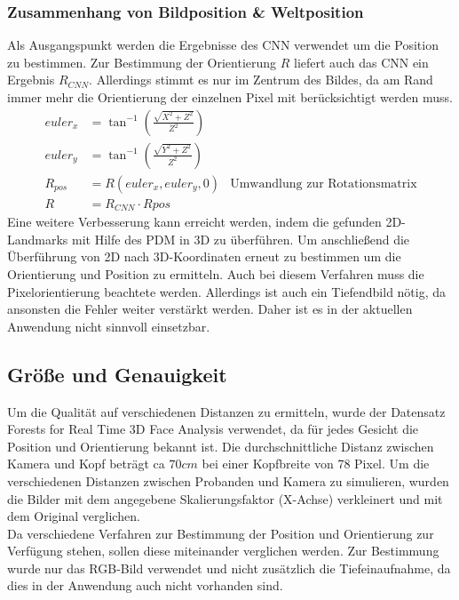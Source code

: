 \subsubsection{Zusammenhang von Bildposition \& Weltposition}
Als Ausgangspunkt werden die Ergebnisse des CNN verwendet um die Position zu bestimmen. Zur Bestimmung der Orientierung $R$ liefert auch das CNN ein Ergebnis $R_{CNN}$. Allerdings stimmt es nur im Zentrum des Bildes, da am Rand immer mehr die Orientierung der einzelnen Pixel mit berücksichtigt werden muss.\\
\begin{align*}
euler_x &= \tan^{-1}(\frac{\sqrt{X^2+Z^2}}{Z^2})\\
euler_y &= \tan^{-1}(\frac{\sqrt{Y^2+Z^2}}{Z^2})\\
R_{pos} &= R(euler_x,euler_y,0)&\text{Umwandlung zur Rotationsmatrix}\\
R &= R_{CNN}\cdot R{pos}
\end{align*}
Eine weitere Verbesserung kann erreicht werden, indem die gefunden 2D-Landmarks mit Hilfe des PDM in 3D zu überführen. Um anschließend die Überführung von 2D nach 3D-Koordinaten erneut zu bestimmen um die Orientierung und Position zu ermitteln. Auch bei diesem Verfahren muss die Pixelorientierung beachtete werden. Allerdings ist auch ein Tiefendbild nötig, da ansonsten die Fehler weiter verstärkt werden. Daher ist es in der aktuellen Anwendung nicht sinnvoll einsetzbar.
\subsection{Größe und Genauigkeit}
Um die Qualität auf verschiedenen Distanzen zu ermitteln, wurde der Datensatz Forests for Real Time 3D Face Analysis \cite{database_Face_Ori} verwendet, da für jedes Gesicht die Position und Orientierung bekannt ist.
Die durchschnittliche Distanz zwischen Kamera und Kopf beträgt ca $70cm$ bei einer Kopfbreite von 78 Pixel. Um die verschiedenen Distanzen zwischen Probanden und Kamera zu simulieren, wurden die Bilder mit dem angegebene Skalierungsfaktor (X-Achse) verkleinert und mit dem Original verglichen.\\
Da verschiedene Verfahren zur Bestimmung der Position und Orientierung zur Verfügung stehen, sollen diese miteinander verglichen werden. Zur Bestimmung wurde nur das RGB-Bild verwendet und nicht zusätzlich die Tiefeinaufnahme, da dies in der Anwendung auch nicht vorhanden sind.
